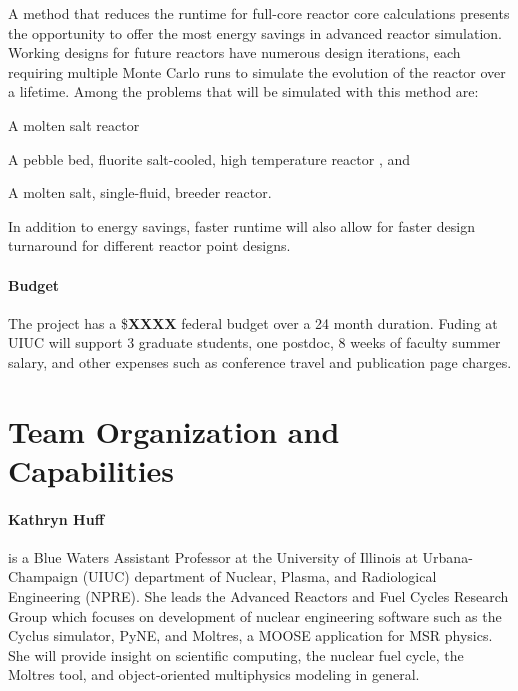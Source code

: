 \documentclass[letterpaper,12pt]{article}
\begin{document}
A method that reduces the runtime for full-core reactor core calculations
presents the opportunity to offer the most energy savings in advanced reactor
simulation. Working designs for future reactors have numerous design iterations,
each requiring multiple Monte Carlo runs to simulate the evolution of the
reactor over a lifetime. Among the problems that will be
simulated with this method are:
\begin{compactitem}
  \item A molten salt reactor \cite{robertson_msre_1965}
  \item A pebble bed, fluorite salt-cooled, high temperature
    reactor \cite{andreades_design_2016}, and
  \item A molten salt, single-fluid, breeder
    reactor\cite{robertson_conceptual_1971}.
\end{compactitem}
In addition to energy savings, faster runtime will also allow for faster design
turnaround for different reactor point designs.
\paragraph{Budget} The project has a \$\textbf{XXXX} federal budget over a 24 month duration. Fuding at UIUC will support 3 graduate students, one postdoc, 8 weeks of faculty summer salary, and other expenses such as conference travel and publication page charges.


\section{Team Organization and Capabilities}

\paragraph{Kathryn Huff} is a Blue Waters Assistant Professor at the University
of Illinois at Urbana-Champaign (UIUC) department of Nuclear, Plasma, and
Radiological Engineering (NPRE). She leads the Advanced Reactors and Fuel
Cycles Research Group which focuses on development of nuclear engineering
software such as the Cyclus simulator, PyNE, and Moltres, a MOOSE application
for MSR physics. She will provide insight on scientific computing, the nuclear
fuel cycle, the Moltres tool, and object-oriented multiphysics modeling in
general.
\end{document}
